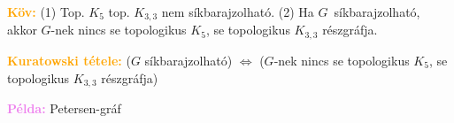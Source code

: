 \documentclass[../../szobeli.tex]{subfiles}
\begin{document}
\begin{itemize}
            \textcolor{orange}{\textbf{Köv:}} (1) Top. $K_5$ top. $K_{3,3}$ nem síkbarajzolható. (2) Ha $G$ síkbarajzolható, akkor $G$-nek nincs se topologikus $K_5$, se topologikus $K_{3,3}$ részgráfja.

            \textcolor{orange}{\textbf{Kuratowski tétele:}} ($G$ síkbarajzolható) $\Longleftrightarrow$ ($G$-nek nincs se topologikus $K_5$, se topologikus $K_{3,3}$ részgráfja) 
            
            \textcolor{violet}{\textbf{Példa:}} Petersen-gráf

    \end{itemize}
\end{document}
